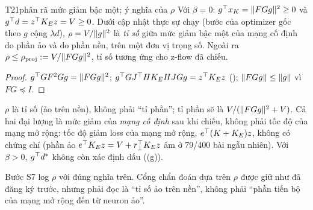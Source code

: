 \begin{namedthm}{T21}{phân rã mức giảm bậc một; ý nghĩa của $\rho$}
Với $\beta=0$: $g^{\top} x_K=\lVert FGg\rVert^2\ge0$ và $g^{\top} d=z^{\top} K_Ez=V\ge0$. Dưới cập nhật thực sự chạy (bước của optimizer gốc theo $g$ cộng $\lambda d$), $\rho=V/\lVert g\rVert^2$ là \emph{tỉ số} giữa mức giảm bậc một của mạng cố định do phần ảo và do phần nền, trên một đơn vị trọng số. Ngoài ra $\rho\le\rho_{\mathrm{proj}}:=V/\lVert FGg\rVert^2$, tỉ số tương ứng cho z-flow đã chiếu.
\end{namedthm}
\begin{proof}
$g^{\top} GF^2Gg=\lVert FGg\rVert^2$; $g^{\top} GJ^{\top} HK_EHJGg=z^{\top} K_Ez$ (); $\lVert FGg\rVert\le\lVert g\rVert$ vì $FG\preceq I$.
\end{proof}
\begin{remark}
$\rho$ là tỉ số (ảo trên nền), không phải ``tỉ phần''; tỉ phần sẽ là $V/(\lVert FGg\rVert^2+V)$. Cả hai đại lượng là mức giảm của \emph{mạng cố định} sau khi chiếu, không phải tốc độ của mạng mở rộng: tốc độ giảm loss của mạng mở rộng, $e^{\top}(K+K_E)z$, không có chứng chỉ (phần ảo $e^{\top} K_Ez=V+r_{\perp}^{\top} K_Ez$ âm ở 79/400 bài ngẫu nhiên). Với $\beta>0$, $g^{\top} d^*$ không còn xác định dấu ((g)).
\end{remark}
\begin{hequa}
Bước S7 log $\rho$ với đúng nghĩa trên. Cổng chẩn đoán dựa trên $\rho$ được giữ như đã đăng ký trước, nhưng phải đọc là ``tỉ số ảo trên nền'', không phải ``phần tiến bộ của mạng mở rộng đến từ neuron ảo''.
\end{hequa}

